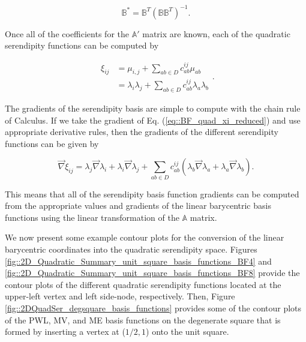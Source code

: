 \begin{equation}
\label{eq::BF_quad_MP_inverse}
\mathbb{B}^* = \mathbb{B}^T (\mathbb{B} \mathbb{B}^T)^{-1}.
\end{equation}

\noindent Once all of the coefficients for the $\mathbb{A}'$ matrix are known, each of the quadratic serendipity functions can be computed by

\begin{equation}
\label{eq::BF_quad_xi_reduced}
\begin{aligned}
\xi_{ij} &=  \mu_{i,j} + \sum_{ab \in D} c_{ab}^{ij} \mu_{ab} \\
&=  \lambda_i \lambda_j + \sum_{ab \in D} c_{ab}^{ij}\lambda_a \lambda_b
\end{aligned} .
\end{equation}

The gradients of the serendipity basis are simple to compute with the chain rule of Calculus. If we take the gradient of Eq. (\ref{eq::BF_quad_xi_reduced}) and use appropriate derivative rules, then the gradients of the different serendipity functions can be given by

\begin{equation}
\label{eq::BF_ser_gradient}
\vec{\nabla} \xi_{ij} = \lambda_j \vec{\nabla} \lambda_i + \lambda_i \vec{\nabla} \lambda_j + \sum_{ab \in D} c_{ab}^{ij} \left(  \lambda_b \vec{\nabla} \lambda_a + \lambda_a \vec{\nabla} \lambda_b \right) .
\end{equation}

\noindent This means that all of the serendipity basis function gradients can be computed from the appropriate values and gradients of the linear barycentric basis functions using the linear transformation of the $\mathbb{A}$ matrix.

We now present some example contour plots for the conversion of the linear barycentric coordinates into the quadratic serendipity space. Figures \ref{fig::2D_Quadratic_Summary_unit_square_basis_functions_BF4} and \ref{fig::2D_Quadratic_Summary_unit_square_basis_functions_BF8} provide the contour plots of the different quadratic serendipity functions located at the upper-left vertex and left side-node, respectively. Then, Figure \ref{fig::2DQuadSer_degsquare_basis_functions} provides some of the contour plots of the PWL, MV, and ME basis functions on the degenerate square that is formed by inserting a vertex at ($1/2,1$) onto the unit square.

